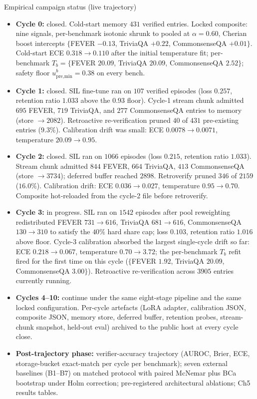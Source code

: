 \documentclass[10pt,aspectratio=169]{beamer}
\begin{document}
\begin{frame}{Empirical campaign status (live trajectory)}
  \scriptsize
  \begin{itemize}
    \item \textbf{Cycle 0:} closed. Cold-start memory $431$ verified entries. Locked composite: nine signals, per-benchmark isotonic shrunk to pooled at $\alpha{=}0.60$, Cherian boost intercepts $\{$FEVER $-0.13$, TriviaQA $+0.22$, CommonsenseQA $+0.01\}$. Cold-start ECE $0.318 \to 0.110$ after the initial temperature fit; per-benchmark $T_b = \{$FEVER $20.09$, TriviaQA $20.09$, CommonsenseQA $2.52\}$; safety floor $u_{\text{pre,min}}^b = 0.38$ on every bench.
    \item \textbf{Cycle 1:} closed. SIL fine-tune ran on $107$ verified episodes (loss $0.257$, retention ratio $1.033$ above the $0.93$ floor). Cycle-1 stream chunk admitted $695$ FEVER, $719$ TriviaQA, and $277$ CommonsenseQA entries to memory (store $\to 2082$). Retroactive re-verification pruned $40$ of $431$ pre-existing entries ($9.3\%$). Calibration drift was small: ECE $0.0078 \to 0.0071$, temperature $20.09 \to 0.95$.
    \item \textbf{Cycle 2:} closed. SIL ran on $1066$ episodes (loss $0.215$, retention ratio $1.033$). Stream chunk admitted $844$ FEVER, $664$ TriviaQA, $413$ CommonsenseQA (store $\to 3734$); deferred buffer reached $2898$. Retroverify pruned $346$ of $2159$ ($16.0\%$). Calibration drift: ECE $0.036 \to 0.027$, temperature $0.95 \to 0.70$. Composite hot-reloaded from the cycle-2 file before retroverify.
    \item \textbf{Cycle 3:} in progress. SIL ran on $1542$ episodes after pool reweighting redistributed FEVER $731 \to 616$, TriviaQA $681 \to 616$, CommonsenseQA $130 \to 310$ to satisfy the $40\%$ hard share cap; loss $0.103$, retention ratio $1.016$ above floor. Cycle-3 calibration absorbed the largest single-cycle drift so far: ECE $0.218 \to 0.067$, temperature $0.70 \to 3.72$; the per-benchmark $T_b$ refit fired for the first time on this cycle ($\{$FEVER $1.92$, TriviaQA $20.09$, CommonsenseQA $3.00\}$). Retroactive re-verification across $3905$ entries currently running.
    \item \textbf{Cycles 4--10:} continue under the same eight-stage pipeline and the same locked configuration. Per-cycle artefacts (LoRA adapter, calibration JSON, composite JSON, memory store, deferred buffer, retention probes, stream-chunk snapshot, held-out eval) archived to the public host at every cycle close.
    \item \textbf{Post-trajectory phase:} verifier-accuracy trajectory (AUROC, Brier, ECE, storage-bucket exact-match per cycle per benchmark); seven external baselines (B1--B7) on matched protocol with paired McNemar plus BCa bootstrap under Holm correction; pre-registered architectural ablations; Ch5 results tables.
  \end{itemize}


\end{frame}
\end{document}
